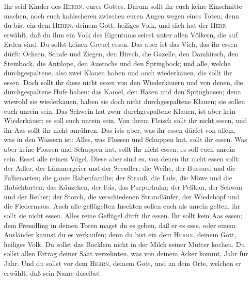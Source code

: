  Ihr seid Kinder des \textsc{Herrn}, eures Gottes. Darum
sollt ihr euch keine Einschnitte machen, noch euch kahlscheren zwischen
euren Augen wegen eines Toten;  denn du bist ein dem
\textsc{Herrn}, deinem Gott, heiliges Volk, und dich hat der
\textsc{Herr} erwählt, daß du ihm ein Volk des Eigentums seiest unter
allen Völkern, die auf Erden sind.  Du sollst keinen
Greuel essen.  Das aber ist das Vieh, das ihr essen dürft:
Ochsen, Schafe und Ziegen,  den Hirsch, die Gazelle, den
Damhirsch, den Steinbock, die Antilope, den Auerochs und den Springbock;
 und alle, welche durchgespaltene, also zwei Klauen haben
und auch wiederkäuen, die sollt ihr essen.  Doch sollt ihr
diese nicht essen von den Wiederkäuern und von denen, die
durchgespaltene Hufe haben: das Kamel, den Hasen und den Springhasen;
denn wiewohl sie wiederkäuen, haben sie doch nicht durchgespaltene
Klauen; sie sollen euch unrein sein.  Das Schwein hat zwar
durchgespaltene Klauen, ist aber kein Wiederkäuer; es soll euch unrein
sein. Von ihrem Fleisch sollt ihr nicht essen, und ihr Aas sollt ihr
nicht anrühren.  Das ist\textquotesingle s aber, was ihr
essen dürfet von allem, was in den Wassern ist: Alles, was Flossen und
Schuppen hat, sollt ihr essen.  Was aber keine Flossen
und Schuppen hat, sollt ihr nicht essen; es soll euch unrein sein.
 Esset alle reinen Vögel.  Diese aber sind
es, von denen ihr nicht essen sollt: der Adler, der Lämmergeier und der
Seeadler;  die Weihe, der Bussard und die Falkenarten;
 die ganze Rabenfamilie;  der Strauß, die
Eule, die Möwe und die Habichtarten;  das Käuzchen, der
Ibis, das Purpurhuhn;  der Pelikan, der Schwan und der
Reiher;  der Storch, die verschiedenen Strandläufer, der
Wiedehopf und die Fledermaus.  Auch alle geflügelten
Insekten sollen euch als unrein gelten, ihr sollt sie nicht essen.
 Alles reine Geflügel dürft ihr essen. 
Ihr sollt kein Aas essen; dem Fremdling in deinen Toren magst du es
geben, daß er es esse, oder einem Ausländer kannst du es verkaufen; denn
du bist ein dem \textsc{Herrn}, deinem Gott, heiliges Volk. Du sollst
das Böcklein nicht in der Milch seiner Mutter kochen.  Du
sollst allen Ertrag deiner Saat verzehnten, was von deinem Acker kommt,
Jahr für Jahr.  Und du sollst vor dem \textsc{Herrn},
deinem Gott, und an dem Orte, welchen er erwählt, daß sein Name daselbst
